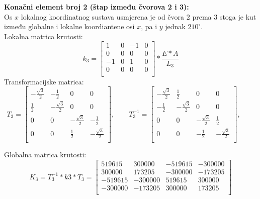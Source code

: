 \documentclass[a4paper,twoside,12pt]{memoir} %
\begin{document}
\textbf{Konačni element broj 2 (štap između čvorova 2 i 3):} \\
Os $x$ lokalnog koordinatnog sustava usmjerena je od čvora 2 prema 3 stoga je kut između globalne i lokalne koordiantene osi $x$, pa i $y$ jednak $210^\circ$. \\
Lokalna matrica krutosti:
\begin{equation}
    k_3 = 
    \begin{bmatrix}
    1 & 0 & -1 & 0 \\
    0 & 0 & 0 & 0 \\
    -1 & 0 & 1 & 0 \\
    0 & 0 & 0 & 0 \\
    \end{bmatrix} * \frac{E * A}{L_3}
\end{equation}
Transformacijske matrica:
\begin{equation}
    T_3 =
    \begin{bmatrix}
    -\frac{\sqrt{3}}{2} & -\frac{1}{2} & 0 & 0 \\
    \frac{1}{2} & -\frac{\sqrt{3}}{2} & 0 & 0 \\
    0 & 0 & -\frac{\sqrt{3}}{2} & -\frac{1}{2} \\
    0 & 0 & \frac{1}{2} & -\frac{\sqrt{3}}{2} \\
    \end{bmatrix}, \qquad
    T^{-1}_3 =
    \begin{bmatrix}
    -\frac{\sqrt{3}}{2} & \frac{1}{2} & 0 & 0 \\
    -\frac{1}{2} & -\frac{\sqrt{3}}{2} & 0 & 0 \\
    0 & 0 & -\frac{\sqrt{3}}{2} & \frac{1}{2} \\
    0 & 0 & -\frac{1}{2} & -\frac{\sqrt{3}}{2} \\
    \end{bmatrix}, \qquad
\end{equation}

Globalna matrica krutosti:
\begin{equation}
    K_3 = T^{-1}_3 * k3 * T_3 =
    \begin{bmatrix}
    519615 & 300000 & -519615 & -300000 \\
    300000 & 173205 & -300000 & -173205 \\
    -519615 & -300000 & 519615 & 300000 \\
    -300000 & -173205 & 300000 & 173205 \\
    \end{bmatrix}
\end{equation}
\end{document}
